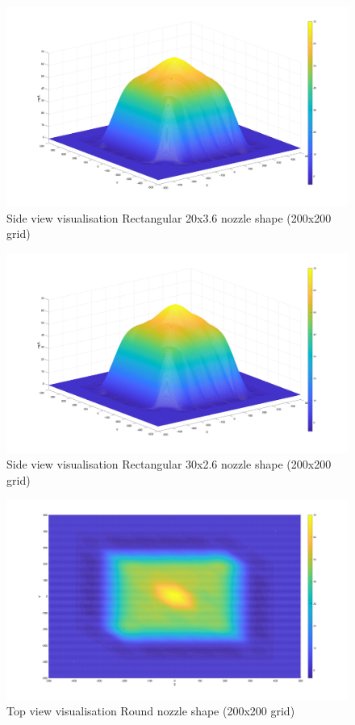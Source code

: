 \begin{figure}
    \centering
    \includegraphics[width=0.75\linewidth]{Images/Rec20_side.jpg}
    \caption{Side view visualisation Rectangular 20x3.6 nozzle shape (200x200 grid)}
\end{figure}

\begin{figure}
    \centering
    \includegraphics[width=0.75\linewidth]{Images/Rec30_side.jpg}
    \caption{Side view visualisation Rectangular 30x2.6 nozzle shape (200x200 grid)}
\end{figure}

\begin{figure}
    \centering
    \includegraphics[width=0.75\linewidth]{Images/Round_top.jpg}
    \caption{Top view visualisation Round nozzle shape (200x200 grid)}
\end{figure}

